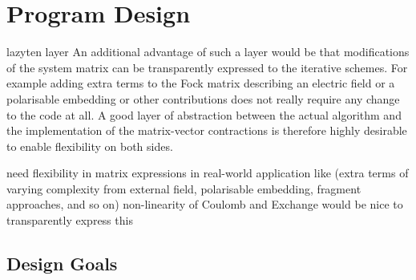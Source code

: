  \section{Program Design}
\label{sec:design}

lazyten layer
An additional advantage of such a layer would be that
modifications of the system matrix can be transparently expressed
to the iterative schemes.
For example adding extra terms to the Fock matrix
describing an electric field or a polarisable embedding
or other contributions does not really require
any change to the \SCF code at all.
A good layer of abstraction between the actual \SCF algorithm
and the implementation of the matrix-vector contractions
is therefore highly desirable to enable flexibility on both sides.

need flexibility in matrix expressions in real-world application
like \SCF (extra terms of varying complexity from external field,
polarisable embedding, fragment approaches, and so on)
non-linearity of Coulomb and Exchange
would be nice to transparently express this





\subsection{Design Goals}
\label{sec:design-goals}



